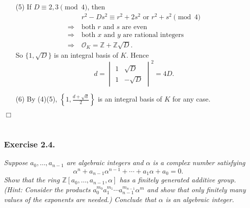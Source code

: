 \documentclass{article}
\begin{document}
\begin{enumerate}
\item[(5)]
  If $D \equiv 2, 3 \pmod 4$, then
  \begin{align*}
    &\:r^2 - Ds^2 \equiv r^2+2s^2 \text{ or } r^2+s^2 \pmod 4 \\
    \Longrightarrow &\:
    \text{both $r$ and $s$ are even} \\
    \Longrightarrow &\:
    \text{both $x$ and $y$ are rational integers} \\
    \Longrightarrow &\:
    \mathcal{O}_K = \mathbb{Z} + \mathbb{Z}\sqrt{D}.
  \end{align*}
  So $\{ 1, \sqrt{D} \}$ is an integral basis of $K$.
  Hence
  \[
    d
    =
    \begin{vmatrix}
      1 & \sqrt{D} \\
      1 & -\sqrt{D}
    \end{vmatrix}^2
    = 4D.
  \]

\item[(6)]
  By (4)(5),
  $\left\{ 1, \frac{d+\sqrt{d}}{2} \right\}$ is an integral basis of $K$
  for any case.
\end{enumerate}
$\Box$ \\\\






\subsubsection*{Exercise 2.4.}
\emph{Suppose $a_0, \ldots, a_{n-1}$ are algebraic integers and
$\alpha$ is a complex number satisfying
$$\alpha^n + a_{n-1} \alpha^{n-1} + \cdots + a_1 \alpha + a_0 = 0.$$
Show that the ring
$\mathbb{Z}[a_0, \ldots, a_{n-1}, \alpha]$ has a finitely generated additive group.
(Hint: Consider the products $a_0^{m_0} a_1^{m_1} \cdots a_{n-1}^{m_{n-1}} \alpha^m$
and show that only finitely many values of the exponents are needed.)
Conclude that $\alpha$ is an algebraic integer.} \\
\end{document}
